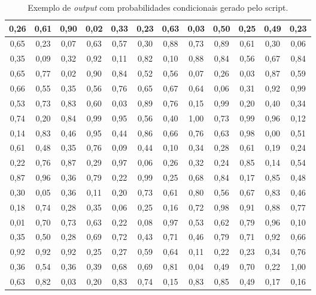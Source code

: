 \begin{table}[H]
\caption{Exemplo de \emph{output} com probabilidades condicionais gerado pelo script.}
\label{q.output1}
\centering
\begin{tabular}{|c|c|c|c|c|c|c|c|c|c|c|c|}
\hline
0,26 & 0,61 & 0,90 & 0,02 & 0,33 & 0,23 & 0,63 & 0,03 & 0,50 & 0,25 & 0,49 & 0,23 \\ \hline
0,65 & 0,23 & 0,07 & 0,63 & 0,57 & 0,30 & 0,88 & 0,73 & 0,89 & 0,61 & 0,30 & 0,06 \\ \hline
0,35 & 0,09 & 0,32 & 0,92 & 0,11 & 0,82 & 0,10 & 0,88 & 0,84 & 0,56 & 0,67 & 0,84 \\ \hline
0,65 & 0,77 & 0,02 & 0,90 & 0,84 & 0,52 & 0,56 & 0,07 & 0,26 & 0,03 & 0,87 & 0,59 \\ \hline
0,66 & 0,55 & 0,35 & 0,56 & 0,76 & 0,65 & 0,67 & 0,64 & 0,06 & 0,31 & 0,92 & 0,99 \\ \hline
0,53 & 0,73 & 0,83 & 0,60 & 0,03 & 0,89 & 0,76 & 0,15 & 0,99 & 0,20 & 0,40 & 0,34 \\ \hline
0,74 & 0,20 & 0,84 & 0,99 & 0,95 & 0,56 & 0,40 & 1,00 & 0,73 & 0,99 & 0,96 & 0,12 \\ \hline
0,14 & 0,83 & 0,46 & 0,95 & 0,44 & 0,86 & 0,66 & 0,76 & 0,63 & 0,98 & 0,00 & 0,51 \\ \hline
0,61 & 0,48 & 0,35 & 0,76 & 0,09 & 0,44 & 0,10 & 0,34 & 0,28 & 0,61 & 0,19 & 0,24 \\ \hline
0,22 & 0,76 & 0,87 & 0,29 & 0,97 & 0,06 & 0,26 & 0,32 & 0,24 & 0,85 & 0,14 & 0,54 \\ \hline
0,87 & 0,96 & 0,36 & 0,79 & 0,22 & 0,99 & 0,25 & 0,68 & 0,84 & 0,17 & 0,85 & 0,48 \\ \hline
0,30 & 0,05 & 0,36 & 0,11 & 0,20 & 0,73 & 0,61 & 0,80 & 0,56 & 0,67 & 0,83 & 0,46 \\ \hline
0,18 & 0,74 & 0,28 & 0,35 & 0,06 & 0,25 & 0,16 & 0,72 & 0,98 & 0,91 & 0,88 & 0,77 \\ \hline
0,01 & 0,70 & 0,73 & 0,63 & 0,22 & 0,08 & 0,97 & 0,53 & 0,62 & 0,79 & 0,96 & 0,10 \\ \hline
0,35 & 0,50 & 0,28 & 0,69 & 0,72 & 0,43 & 0,71 & 0,46 & 0,79 & 0,71 & 0,92 & 0,66 \\ \hline
0,92 & 0,92 & 0,92 & 0,25 & 0,27 & 0,59 & 0,64 & 0,11 & 0,22 & 0,23 & 0,34 & 0,76 \\ \hline
0,36 & 0,54 & 0,36 & 0,39 & 0,68 & 0,69 & 0,81 & 0,04 & 0,49 & 0,70 & 0,22 & 1,00 \\ \hline
0,63 & 0,82 & 0,03 & 0,20 & 0,83 & 0,74 & 0,15 & 0,83 & 0,85 & 0,49 & 0,17 & 0,16 \\ \hline

\end{tabular}
\end{table}

